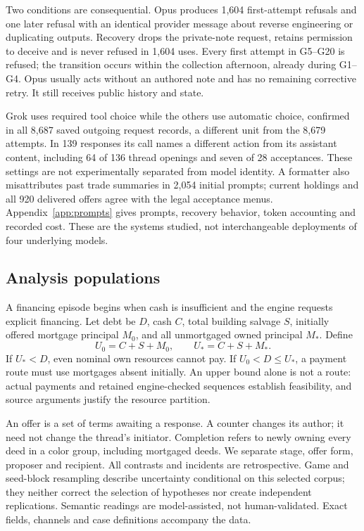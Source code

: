 Two conditions are consequential. Opus produces 1,604 first-attempt refusals and one later refusal with an identical provider message about reverse engineering or duplicating outputs. Recovery drops the private-note request, retains permission to deceive and is never refused in 1,604 uses. Every first attempt in G5--G20 is refused; the transition occurs within the collection afternoon, already during G1--G4. Opus usually acts without an authored note and has no remaining corrective retry. It still receives public history and state.

Grok uses required tool choice while the others use automatic choice, confirmed in all 8,687 saved outgoing request records, a different unit from the 8,679 attempts. In 139 responses its call names a different action from its assistant content, including 64 of 136 thread openings and seven of 28 acceptances. These settings are not experimentally separated from model identity. A formatter also misattributes past trade summaries in 2,054 initial prompts; current holdings and all 920 delivered offers agree with the legal acceptance menus. Appendix~\ref{app:prompts} gives prompts, recovery behavior, token accounting and recorded cost. These are the systems studied, not interchangeable deployments of four underlying models.

\subsection{Analysis populations}
A financing episode begins when cash is insufficient and the engine requests explicit financing. Let debt be $D$, cash $C$, total building salvage $S$, initially offered mortgage principal $M_0$, and all unmortgaged owned principal $M_*$. Define
\[
U_0=C+S+M_0,\qquad U_*=C+S+M_*.
\]
If $U_*<D$, even nominal own resources cannot pay. If $U_0<D\leq U_*$, a payment route must use mortgages absent initially. An upper bound alone is not a route: actual payments and retained engine-checked sequences establish feasibility, and source arguments justify the resource partition.

An offer is a set of terms awaiting a response. A counter changes its author; it need not change the thread's initiator. Completion refers to newly owning every deed in a color group, including mortgaged deeds. We separate stage, offer form, proposer and recipient. All contrasts and incidents are retrospective. Game and seed-block resampling describe uncertainty conditional on this selected corpus; they neither correct the selection of hypotheses nor create independent replications. Semantic readings are model-assisted, not human-validated. Exact fields, channels and case definitions accompany the data.

